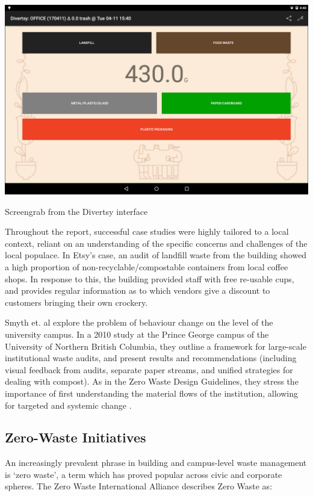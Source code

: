 \documentclass[nofonts,nols,justified,nobib]{tufte-book}
\begin{document}
\begin{marginfigure}
\includegraphics[width=\textwidth]{img/1/divertsy.png}
\caption{Screengrab from the Divertsy interface \cite{benninger_divertsy_2019}}
\end{marginfigure}


Throughout the report, successful case studies were highly tailored to a local context, reliant on an understanding of the specific concerns and challenges of the local populace. In Etsy's case, an audit of landfill waste from the building showed a high proportion of non-recyclable/compostable containers from local coffee shops. In response to this, the building provided staff with free re-usable cups, and provides regular information as to which vendors give a discount to customers bringing their own crockery.


Smyth et. al explore the problem of behaviour change on the level of the university campus. In a 2010 study at the Prince George campus of the University of Northern British Columbia, they outline a framework for large-scale institutional waste audits, and present results and recommendations (including visual feedback from audits, separate paper streams, and unified strategies for dealing with compost). As in the Zero Waste Design Guidelines, they stress the importance of first understanding the material flows of the institution, allowing for targeted and systemic change \cite{smyth_reducing_2010}.


\subsection*{Zero-Waste Initiatives}

An increasingly prevalent phrase in building and campus-level waste management is `zero waste', a term which has proved popular across civic and corporate spheres. The Zero Waste International Alliance describes Zero Waste as:
\end{document}
